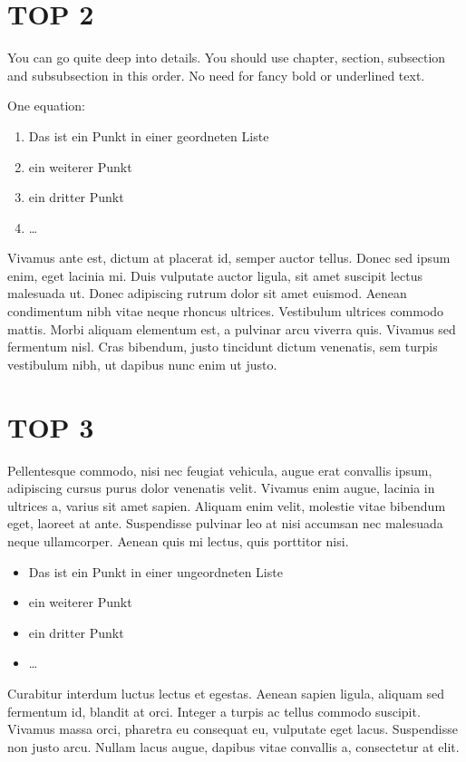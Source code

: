 \documentclass[11pt,a4paper,oneside]{scrartcl}
\begin{document}
\section*{TOP 2}
You can go quite deep into details. You should use chapter, section, 
subsection and subsubsection in this order. No need for fancy bold or
underlined text.

One equation:
\begin{enumerate}
    \item Das ist ein Punkt in einer geordneten Liste
    \item ein weiterer Punkt
    \item ein dritter Punkt
    \item \dots
\end{enumerate}

Vivamus ante est, dictum at placerat id, semper auctor tellus. Donec 
\arrow sed ipsum enim, eget lacinia mi. Duis vulputate auctor ligula, sit 
amet suscipit lectus malesuada ut. Donec adipiscing rutrum dolor sit 
amet euismod. Aenean condimentum nibh vitae neque rhoncus ultrices. 
Vestibulum ultrices commodo mattis. Morbi aliquam elementum est, a 
pulvinar arcu viverra quis. Vivamus sed fermentum nisl. Cras 
bibendum, justo tincidunt dictum venenatis, sem turpis vestibulum 
nibh, ut dapibus nunc enim ut justo. 

\section*{TOP 3}
Pellentesque commodo, nisi nec feugiat vehicula, augue erat convallis ipsum, adipiscing cursus purus dolor venenatis velit. Vivamus enim augue, lacinia in ultrices a, varius sit amet sapien. Aliquam enim velit, molestie vitae bibendum eget, laoreet at ante. Suspendisse pulvinar leo at nisi accumsan nec malesuada neque ullamcorper. Aenean quis mi lectus, quis porttitor nisi. 
\begin{itemize}
    \item Das ist ein Punkt in einer ungeordneten Liste
    \item ein weiterer Punkt
    \item ein dritter Punkt
    \item \dots
\end{itemize}
Curabitur interdum luctus lectus et egestas. Aenean sapien ligula, aliquam sed fermentum id, blandit at orci. Integer a turpis ac tellus commodo suscipit. Vivamus massa orci, pharetra eu consequat eu, vulputate eget lacus. Suspendisse non justo arcu. Nullam lacus augue, dapibus vitae convallis a, consectetur at elit.
\end{document}
